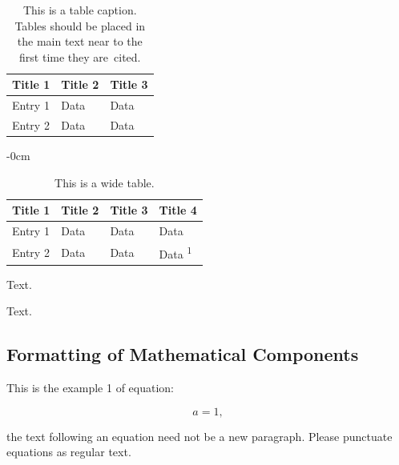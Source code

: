 \documentclass[mathematics,article,submit,pdftex,moreauthors]{Definitions/mdpi}
\begin{document}
\begin{table}[H]
\caption{This is a table caption. Tables should be placed in the main text near to the first time they are~cited.\label{tab1}}
\begin{tabularx}{\textwidth}{CCC}
\toprule
\textbf{Title 1}	& \textbf{Title 2}	& \textbf{Title 3}\\
\midrule
Entry 1		& Data			& Data\\
Entry 2		& Data			& Data\\
\bottomrule
\end{tabularx}
\end{table}
\unskip

\begin{table}[H]
\caption{This is a wide table.\label{tab2}}
	\begin{adjustwidth}{-\extralength}{0cm}
		\begin{tabularx}{\fulllength}{CCCC}
			\toprule
			\textbf{Title 1}	& \textbf{Title 2}	& \textbf{Title 3}     & \textbf{Title 4}\\
			\midrule
			Entry 1		& Data			& Data			& Data\\
			Entry 2		& Data			& Data			& Data \textsuperscript{1}\\
			\bottomrule
		\end{tabularx}
	\end{adjustwidth}
\end{table}


Text.

Text.

\subsection{Formatting of Mathematical Components}

This is the example 1 of equation:
\begin{linenomath}
\begin{equation}
a = 1,
\end{equation}
\end{linenomath}
the text following an equation need not be a new paragraph. Please punctuate equations as regular text.
\end{document}
